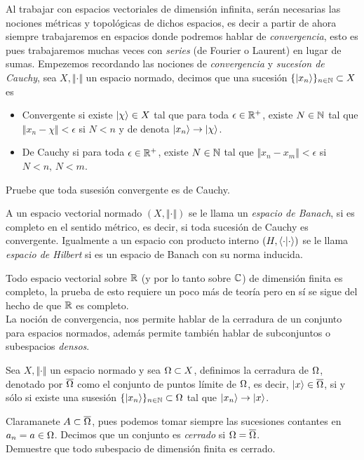 \documentclass[main.tex]{subfiles}
\begin{document}
\noindent Al trabajar con espacios vectoriales de dimensión infinita, serán necesarias las nociones métricas y topológicas de dichos espacios, es decir a partir de ahora siempre trabajaremos en espacios donde podremos hablar de \emph{convergencia}, esto es pues trabajaremos muchas veces con \emph{series} (de Fourier o Laurent) en lugar de sumas.
Empezemos recordando las nociones de \emph{convergencia} y \emph{sucesíon de Cauchy}, sea \(X,\Vert\cdot\Vert\) un espacio normado, decimos que una sucesión \(\{\ket{x_n}\}_{n\in \mathbb N }\subset X\) es
\begin{itemize}
  \item Convergente si existe \(\ket{\chi}\in X\) tal que para toda \(\epsilon\in\mathbb R ^{+}\), existe \(N\in \mathbb N \) tal que \(\Vert x_n-\chi\Vert<\epsilon\) si \(N<n\) y de denota \(\ket{x_n}\rightarrow\ket{\chi}\).
  \item De Cauchy si para toda \(\epsilon\in\mathbb R ^{+}\), existe \(N\in \mathbb N \) tal que \(\Vert x_n-x_m\Vert<\epsilon\) si \(N<n,\,N<m\).
  \end{itemize}
\exe Pruebe que toda susesión convergente es de Cauchy.
\begin{def.}
  A un espacio vectorial normado \((X,\Vert\cdot\Vert)\) se le llama un \emph{espacio de Banach}, si es completo en el sentido métrico, es decir, si toda sucesión de Cauchy es convergente. Igualmente a un espacio con producto interno \((H,\braket{\cdot|\cdot})\) se le llama \emph{espacio de Hilbert} si es un espacio de Banach con su norma inducida.
  \end{def.}
\eje Todo espacio vectorial sobre \(\mathbb R \) (y por lo tanto sobre \(\mathbb C \)) de dimensión finita es completo, la prueba de esto requiere un poco más de teoría pero en sí se sigue del hecho de que \(\mathbb R \) es completo.\\
La noción de convergencia, nos permite hablar de la cerradura de un conjunto para espacios normados, además permite también hablar de subconjuntos o subespacios \emph{densos}.
\begin{def.}
  Sea \(X,\Vert\cdot\Vert\) un espacio normado y sea \(\Omega\subset X\), definimos la cerradura de \(\Omega\), denotado por \(\overline{\Omega}\) como el conjunto de puntos límite de \(\Omega\), es decir, \(\ket{x}\in\overline{\Omega}\), si y sólo si existe una susesión \(\{\ket{x_n}\}_{n\in \mathbb N }\subset\Omega\) tal que \(\ket{x_n}\rightarrow\ket{x}\).
  \end{def.}
Claramanete \(A\subset\overline{\Omega}\), pues podemos tomar siempre las sucesiones contantes en \(a_n=a\in\Omega\). Decimos que un conjunto es \emph{cerrado} si \(\Omega=\overline{\Omega}\).\\
\exe Demuestre que todo subespacio de dimensión finita es cerrado.\\
\end{document}
